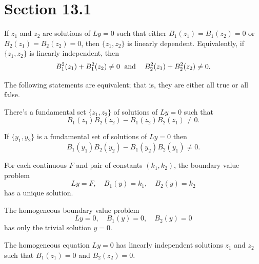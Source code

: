 \section*{Section 13.1}
{}
\setcounter{chapter}{13}
\setcounter{section}{1}

\setcounter{theorem}{0}
\begin{theorem}
  \label{thmtype:13.1.1} If $z_{1}$ and $z_{2}$ are solutions of $Ly=0$ such that either
  $B_{1}(z_{1})=B_{1}(z_{2})=0$ or $B_{2}(z_{1})=B_{2}(z_{2})=0$, then $\{z_{1},z_{2}\}$ is linearly
  dependent. Equivalently, if\, $\{z_{1},z_{2}\}$ is linearly independent, then
  \[
    B_{1}^{2}(z_{1})+B_{1}^{2}(z_{2})\ne0\text{\; and\; \; }B_{2}^{2}(z_{1})+B_{2}^{2}(z_{2})\ne0.
  \]
\end{theorem}

\setcounter{theorem}{1}
\setcounter{equation}{7}
\begin{theorem}
  \label{thmtype:13.1.2} The following statements are equivalent; that is, they are either all true
  or all false.
  \begin{alist}
    \item %
    There's a fundamental set $\{z_{1},z_{2}\}$ of solutions of $Ly=0$ such that
    \begin{equation}
      \label{eq:13.1.8}B_{1}(z_{1})B_{2}(z_{2})-B_{1}(z_{2})B_{2}(z_{1})\ne0.
    \end{equation}

    \item %
    If $\{y_{1},y_{2}\}$ is a fundamental set of solutions of $Ly=0$ then
    \begin{equation}
      \label{eq:13.1.9}B_{1}(y_{1})B_{2}(y_{2})-B_{1}(y_{2})B_{2}(y_{1})\ne0.
    \end{equation}

    \item %
    For each continuous $F$ and pair of constants $(k_{1},k_{2})$, the boundary value problem
    \[
      Ly=F,\quad B_{1}(y)=k_{1},\quad B_{2}(y)=k_{2}
    \]
    has a unique solution.

    \item %
    The homogeneous boundary value problem
    \begin{equation}
      \label{eq:13.1.10}Ly=0,\quad B_{1}(y)=0,\quad B_{2}(y)=0
    \end{equation}
    has only the trivial solution $y=0$.

    \item %
    The homogeneous equation $Ly=0$ has linearly independent solutions $z_{1}$ and $z_{2}$ such that
    $B_{1}(z_{1})=0$ and $B_{2}(z_{2})=0$.
  \end{alist}
\end{theorem}

